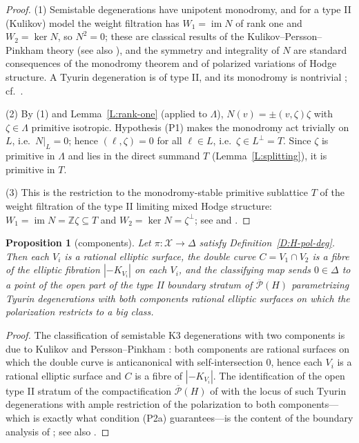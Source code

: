 \documentclass[11pt]{amsart}
\theoremstyle{plain}
\newtheorem{proposition}[theorem]{Proposition}
\theoremstyle{definition}
\theoremstyle{remark}
\numberwithin{equation}{section}
\begin{document}
\begin{proof}
(1) Semistable degenerations have unipotent monodromy, and for a type II
(Kulikov) model the weight filtration has
\(W_{1}=\operatorname{im}N\) of rank one and \(W_{2}=\ker N\), so
\(N^{2}=0\); these are classical results of the Kulikov--Persson--Pinkham
theory \cite{perssonpinkham} (see also \cite{friedman}), and the symmetry and
integrality of \(N\) are standard consequences of the monodromy theorem and
of polarized variations of Hodge structure. A Tyurin degeneration is of type
II, and its monodromy is nontrivial \cite{perssonpinkham};
cf.\ \cite[\S 3]{dfk3slpms}.

(2) By (1) and Lemma~\ref{L:rank-one} (applied to \(\Lambda\)),
\(N(v)=\pm(v,\zeta)\zeta\) with \(\zeta\in\Lambda\) primitive isotropic.
Hypothesis (P1) makes the monodromy act trivially on \(L\), i.e.\
\(N|_{L}=0\); hence \((\ell,\zeta)=0\) for all \(\ell\in L\), i.e.\
\(\zeta\in L^{\perp}=T\). Since \(\zeta\) is primitive in \(\Lambda\) and
lies in the direct summand \(T\) (Lemma~\ref{L:splitting}), it is primitive
in \(T\).

(3) This is the restriction to the monodromy-stable primitive sublattice
\(T\) of the weight filtration of the type II limiting mixed Hodge structure:
\(W_{1}=\operatorname{im}N=\mathbb Z\zeta\subseteq T\) and
\(W_{2}=\ker N=\zeta^{\perp}\); see \cite{perssonpinkham} and
\cite[\S 3]{dfk3slpms}.
\end{proof}

\begin{proposition}[components]\label{P:components}
Let \(\pi\colon\mathcal X\to\Delta\) satisfy
Definition~\ref{D:H-pol-deg}. Then each \(V_{i}\) is a rational elliptic
surface, the double curve \(C=V_{1}\cap V_{2}\) is a fibre of the elliptic
fibration \(|-K_{V_{i}}|\) on each \(V_{i}\), and the classifying map sends
\(0\in\Delta\) to a point of the open part of the type II boundary stratum of
\(\overline{\mathcal P}(H)\) parametrizing Tyurin degenerations with both
components rational elliptic surfaces on which the polarization restricts to
a big class.
\end{proposition}

\begin{proof}
The classification of semistable K3 degenerations with two components is due
to Kulikov and Persson--Pinkham \cite{perssonpinkham}: both components are
rational surfaces on which the double curve is anticanonical with
self-intersection \(0\), hence each \(V_{i}\) is a rational elliptic surface
and \(C\) is a fibre of \(|-K_{V_{i}}|\). The identification of the open type
II stratum of the compactification \(\overline{\mathcal P}(H)\) of
\cite{cmek3sspt} with the locus of such Tyurin degenerations with ample
restriction of the polarization to both components---which is exactly what
condition (P2a) guarantees---is the content of the boundary analysis of
\cite[Main Theorems]{cmek3sspt}; see also \cite[\S 3]{dfk3slpms}.
\end{proof}
\end{document}
